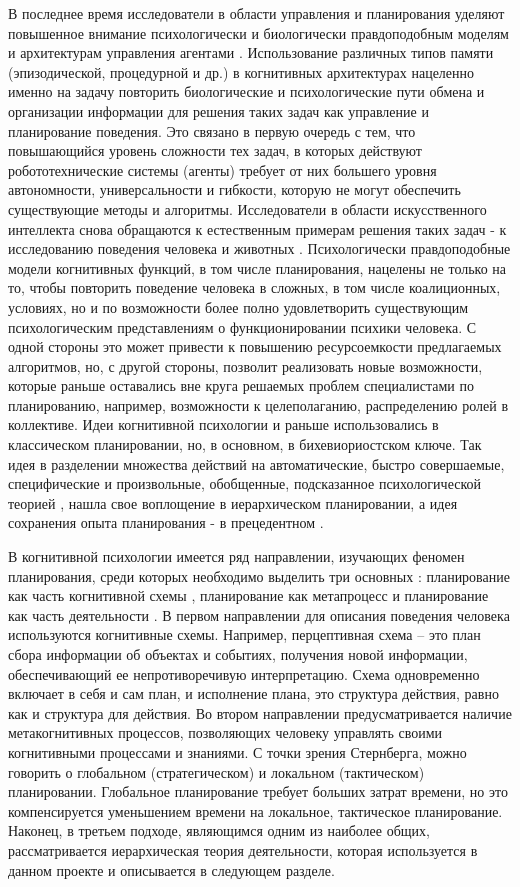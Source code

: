 \documentclass[12pt]{report}
\begin{document}
	В последнее время исследователи в области управления и планирования уделяют повышенное внимание психологически и биологически правдоподобным моделям и архитектурам управления агентами \cite{Kelley2006,Sun2012a}. Использование различных типов памяти (эпизодической, процедурной и др.) в когнитивных архитектурах нацеленно именно на задачу повторить биологические и психологические пути обмена и организации информации для решения таких задач как управление и планирование поведения. Это связано в первую очередь с тем, что повышающийся уровень сложности тех задач, в которых действуют робототехнические системы (агенты) требует от них большего уровня автономности, универсальности и гибкости, которую не могут обеспечить существующие методы и алгоритмы. Исследователи в области искусственного интеллекта снова обращаются к естественным примерам решения таких задач - к исследованию поведения человека и животных \cite{Redko2016,Panov2016d}. Психологически правдоподобные модели когнитивных функций, в том числе планирования, нацелены не только на то, чтобы повторить поведение человека в сложных, в том числе коалиционных, условиях, но и по возможности более полно удовлетворить существующим психологическим представлениям о функционировании психики человека. С одной стороны это может привести к повышению ресурсоемкости предлагаемых алгоритмов, но, с другой стороны, позволит реализовать новые возможности, которые раньше оставались вне круга решаемых проблем специалистами по планированию, например, возможности к целеполаганию, распределению ролей в коллективе. Идеи когнитивной психологии и раньше использовались в классическом планировании, но, в основном, в бихевиориостском ключе. Так идея в разделении множества действий на автоматические, быстро совершаемые, специфические и произвольные, обобщенные, подсказанное психологической теорией \cite{Kahneman2011}, нашла свое воплощение в иерархическом планировании, а идея сохранения опыта планирования - в прецедентном \cite{Hammond1990,DeLaRosa2013,Borrajo2015}.
	
	В когнитивной психологии имеется ряд направлении, изучающих феномен планирования, среди которых необходимо выделить три основных \cite{Chuvgunova2015}: планирование как часть когнитивной схемы \cite{Neisser1976}, планирование как метапроцесс \cite{Flavell1979,Sternberg2000} и планирование как часть деятельности \cite{Leontiev1977}. В первом направлении для описания поведения человека используются когнитивные схемы. Например, перцептивная схема – это план сбора информации об объектах и событиях, получения новой информации, обеспечивающий ее непротиворечивую интерпретацию. Схема одновременно включает в себя и сам план, и исполнение плана, это структура действия, равно как и структура для действия. Во втором направлении предусматривается наличие метакогнитивных процессов, позволяющих человеку управлять своими когнитивными процессами и знаниями. С точки зрения Стернберга, можно говорить о глобальном (стратегическом) и локальном (тактическом) планировании. Глобальное планирование требует больших затрат времени, но это компенсируется уменьшением времени на локальное, тактическое планирование. Наконец, в третьем подходе, являющимся одним из наиболее общих, рассматривается иерархическая теория деятельности, которая используется в данном проекте и описывается в следующем разделе.
	
\end{document}
